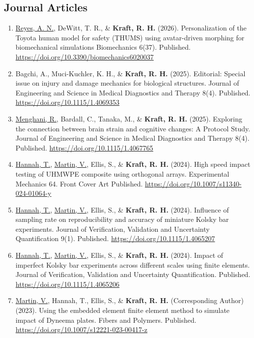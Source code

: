 \documentclass[a4paper,10pt]{article}
\begin{document}
\subsection*{Journal Articles}
\begin{enumerate}
\item \underline{Reyes, A. N.}, DeWitt, T. R., \& \textbf{\textbf{Kraft,} R. H.} (2026). Personalization of the Toyota human model for safety (THUMS) using avatar-driven morphing for biomechanical simulations Biomechanics 6(37). Published. \url{https://doi.org/10.3390/biomechanics6020037}
\item Bagchi, A., Muci-Kuchler, K. H., \& \textbf{\textbf{Kraft,} R. H.} (2025). Editorial: Special issue on injury and damage mechanics for biological structures. Journal of Engineering and Science in Medical Diagnostics and Therapy 8(4). Published. \url{https://doi.org/10.1115/1.4069353}
\item \underline{Menghani, R.}, Bardall, C., Tanaka, M., \& \textbf{\textbf{Kraft,} R. H.} (2025). Exploring the connection between brain strain and cognitive changes: A Protocol Study. Journal of Engineering and Science in Medical Diagnostics and Therapy 8(4). Published. \url{https://doi.org/10.1115/1.4067765}
\item \underline{Hannah, T.}, \underline{Martin, V.}, Ellis, S., \& \textbf{\textbf{Kraft,} R. H.} (2024). High speed impact testing of UHMWPE composite using orthogonal arrays. Experimental Mechanics 64.  Front Cover Art Published. \url{https://doi.org/10.1007/s11340-024-01064-y}
\item \underline{Hannah, T.}, \underline{Martin, V.}, Ellis, S., \& \textbf{\textbf{Kraft,} R. H.} (2024). Influence of sampling rate on reproducibility and accuracy of miniature Kolsky bar experiments. Journal of Verification, Validation and Uncertainty Quantification 9(1). Published. \url{https://doi.org/10.1115/1.4065207}
\item \underline{Hannah, T.}, \underline{Martin, V.}, Ellis, S., \& \textbf{\textbf{Kraft,} R. H.} (2024). Impact of imperfect Kolsky bar experiments across different scales using finite elements. Journal of Verification, Validation and Uncertainty Quantification. Published. \url{https://doi.org/10.1115/1.4065206}
\item \underline{Martin, V.}, Hannah, T., Ellis, S., \& \textbf{\textbf{Kraft,} R. H.} (Corresponding Author) (2023). Using the embedded element finite element method to simulate impact of Dyneema plates. Fibers and Polymers. Published. \url{https://doi.org/10.1007/s12221-023-00417-z}

\end{enumerate}
\end{document}
